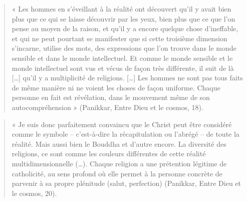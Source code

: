 \begin{quote}
    
« Les hommes en s’éveillant à la réalité ont découvert qu’il y avait bien plus que ce qui se laisse 
découvrir par les yeux, bien plus que ce que l’on pense au moyen de la raison, et qu’il y a encore 
quelque chose d’ineffable, et qui ne peut pourtant se manifester que si cette troisième dimension 
s’incarne, utilise des mots, des expressions que l’on trouve dans le monde sensible et dans le 
monde intellectuel. Et comme le monde sensible et le monde intellectuel sont vus et vécus de façon 
très différente, il suit de là […] qu’il y a multiplicité de religions. […] Les hommes ne sont pas 
tous faits de même manière ni ne voient les choses de façon uniforme. Chaque  personne  en  fait  
est  révélation,  dans  le  mouvement  même  de  son autocompréhension » (Panikkar, Entre Dieu et 
le cosmos, 18).

\end{quote}
\begin{quote}
    
« Je suis donc parfaitement convaincu que le Christ peut être considéré comme le symbole – 
c’est-à-dire la récapitulation ou l’abrégé – de toute la réalité. Mais aussi bien le Bouddha et 
d’autre encore. La diversité des religions, ce sont comme les couleurs différentes de cette réalité 
multidimensionnelle (…). Chaque religion a une prétention légitime de catholicité, au sens profond 
où elle permet à la personne concrète de parvenir à sa propre plénitude (salut,
perfection) (Panikkar, Entre Dieu et le cosmos, 20).





\end{quote}
 





























































